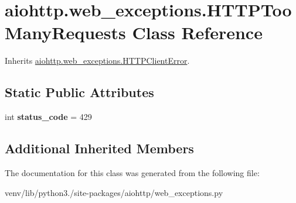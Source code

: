 \hypertarget{classaiohttp_1_1web__exceptions_1_1_h_t_t_p_too_many_requests}{}\section{aiohttp.\+web\+\_\+exceptions.\+H\+T\+T\+P\+Too\+Many\+Requests Class Reference}
\label{classaiohttp_1_1web__exceptions_1_1_h_t_t_p_too_many_requests}


Inherits \hyperlink{classaiohttp_1_1web__exceptions_1_1_h_t_t_p_client_error}{aiohttp.\+web\+\_\+exceptions.\+H\+T\+T\+P\+Client\+Error}.

\subsection*{Static Public Attributes}
\begin{DoxyCompactItemize}
\item 
\mbox{\label{classaiohttp_1_1web__exceptions_1_1_h_t_t_p_too_many_requests_a750a584cc8cf3969d0131fbda3d87b5b}} 
int {\bfseries status\+\_\+code} = 429
\end{DoxyCompactItemize}
\subsection*{Additional Inherited Members}


The documentation for this class was generated from the following file\+:\begin{DoxyCompactItemize}
\item 
venv/lib/python3./site-\/packages/aiohttp/web\+\_\+exceptions.\+py\end{DoxyCompactItemize}
